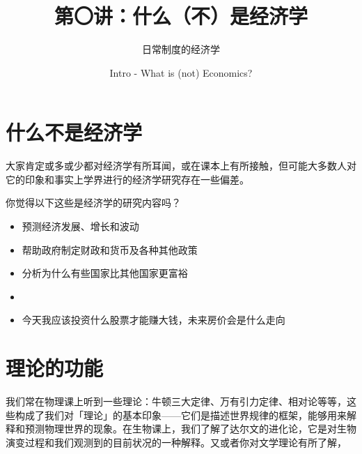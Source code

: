 \documentclass[10pt,a4paper]{ctexart}
\title{\vspace{-2em}\bfseries 第〇讲：什么（不）是经济学}
\author{日常制度的经济学}
\date{Intro - What is (not) Economics?}
\begin{document}
\maketitle
\thispagestyle{fancy}

\begin{goalsbox}
\end{goalsbox}

\section{什么不是经济学}
大家肯定或多或少都对经济学有所耳闻，或在课本上有所接触，但可能大多数人对它的印象和事实上学界进行的经济学研究存在一些偏差。

\begin{questionbox}{你觉得以下这些是经济学的研究内容吗？}
\begin{itemize}
    \item 预测经济发展、增长和波动
    \item 帮助政府制定财政和货币及各种其他政策
    \item 分析为什么有些国家比其他国家更富裕
    \item 
    \item 今天我应该投资什么股票才能赚大钱，未来房价会是什么走向
\end{itemize}
\end{questionbox}

\section{理论的功能}

我们常在物理课上听到一些理论：牛顿三大定律、万有引力定律、相对论等等，这些构成了我们对「理论」的基本印象——它们是描述世界规律的框架，能够用来解释和预测物理世界的现象。在生物课上，我们了解了达尔文的进化论，它是对生物演变过程和我们观测到的目前状况的一种解释。又或者你对文学理论有所了解，
\end{document}
